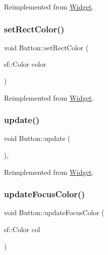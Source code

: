 Reimplemented from \mbox{\hyperlink{class_widget_a038576de7f1adf6b29f3ebfd3515f13f}{Widget}}.

\mbox{\label{class_button_a16df47cdbf999b65b5c9965650970f12}} 
\subsubsection{\texorpdfstring{setRectColor()}{setRectColor()}}
{\footnotesize\ttfamily void Button\+::set\+Rect\+Color (\begin{DoxyParamCaption}\item[{sf\+::\+Color}]{color }\end{DoxyParamCaption})\hspace{0.3cm}{\ttfamily [virtual]}}



Reimplemented from \mbox{\hyperlink{class_widget_a44295ab8e8a07e8206790dd6b317d2fe}{Widget}}.

\mbox{\label{class_button_abda97f1ae8e081da3dbd0b77a27cad9d}} 
\subsubsection{\texorpdfstring{update()}{update()}}
{\footnotesize\ttfamily void Button\+::update (\begin{DoxyParamCaption}{ }\end{DoxyParamCaption})\hspace{0.3cm}{\ttfamily [override]}, {\ttfamily [virtual]}}



Reimplemented from \mbox{\hyperlink{class_widget_a38aacc92bda1a1e91052873a4a955487}{Widget}}.

\mbox{\label{class_button_a2b0211c37e877b51695b62a680b1d82a}} 
\subsubsection{\texorpdfstring{updateFocusColor()}{updateFocusColor()}}
{\footnotesize\ttfamily void Button\+::update\+Focus\+Color (\begin{DoxyParamCaption}\item[{sf\+::\+Color}]{col }\end{DoxyParamCaption})\hspace{0.3cm}{\ttfamily [virtual]}}



